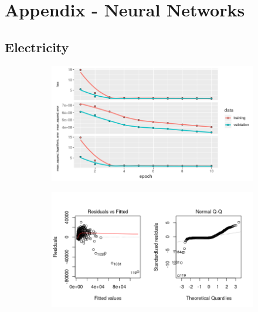\section*{Appendix - Neural Networks}
\label{sec:appendix_nn}
\appendix
\subsection{Electricity}
\label{appendix:electricity:nn_full}
\begin{figure}[h]
\begin{subfigure}{1\textwidth}
\centering
\includegraphics[width=.99\textwidth, height=0.4\textheight]{Images/electricity_nn_full_train_results.png}
\end{subfigure}
\begin{subfigure}{1\textwidth}
\centering
\includegraphics[width=.99\textwidth, height=0.3\textheight]{Images/electricity_nn_full_resid_1.png}
\end{subfigure}
\end{figure}
\newpage
